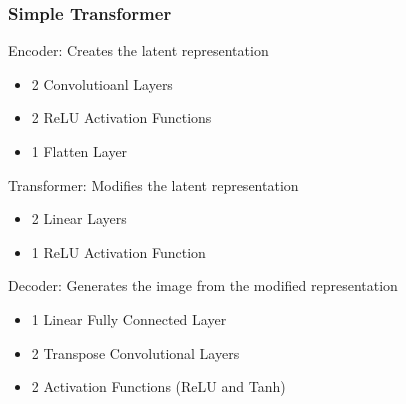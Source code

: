 \begin{frame}
    \frametitle{Simple Transformer}
    Encoder: Creates the latent representation 
    \begin{itemize}
        \item 2 Convolutioanl Layers
        \item 2 ReLU Activation Functions
        \item 1 Flatten Layer
    \end{itemize} 
    Transformer: Modifies the latent representation
    \begin{itemize}
        \item 2 Linear Layers
        \item 1 ReLU Activation Function
    \end{itemize}
    Decoder: Generates the image from the modified representation
    \begin{itemize}
        \item 1 Linear Fully Connected Layer
        \item 2 Transpose Convolutional Layers
        \item 2 Activation Functions (ReLU and Tanh)
    \end{itemize}
\end{frame}

